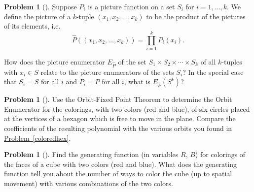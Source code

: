 \documentclass[10pt,]{book}
\theoremstyle{plain}
\theoremstyle{definition}
\newtheorem{activity}[project]{Problem}
\theoremstyle{definition}
\numberwithin{equation}{chapter}
\begin{document}
\begin{activity}[] \label{PictureEnumeratorforFunctions}
Suppose \(P_i\) is a picture function on a set \(S_i\) for \(i=1,\dots,k\). We define the picture of a \(k\)-tuple \((x_1,x_2,\dots,x_k)\) to be the product of the pictures of its elements, i.e.\@%
\begin{equation*}
\widehat P((x_1,x_2,\dots,x_k)) = \prod_{i=1}^k P_i(x_i).
\end{equation*}
%
\par
How does the picture enumerator \(E_{\widehat P}\) of the set \(S_1\times S_2\times\cdots\times S_k\) of all \(k\)-tuples with \(x_i\in S\) relate to the picture enumerators of the sets \(S_i\)? In the special case that \(S_i = S\) for all \(i\) and \(P_i = P\) for all \(i\), what is \(E_{\widehat{P}}(S^k)\)?%
\end{activity}
\begin{activity}[] \label{polya1}
Use the Orbit-Fixed Point Theorem to determine the Orbit Enumerator for the colorings, with two colors (red and blue), of six circles placed at the vertices of a hexagon which is free to move in the plane. Compare the coefficients of the resulting polynomial with the various orbits you found in \hyperref[coloredhex]{Problem~\ref{coloredhex}}.%
\end{activity}
\begin{activity}[]\marginsymbol[-1em]{} \label{polya2}
Find the generating function (in variables \(R\), \(B\)) for colorings of the faces of a cube with two colors (red and blue). What does the generating function tell you about the number of ways to color the cube (up to spatial movement) with various combinations of the two colors.%
\end{activity}
\typeout{************************************************}
\typeout{************************************************}
\end{document}
